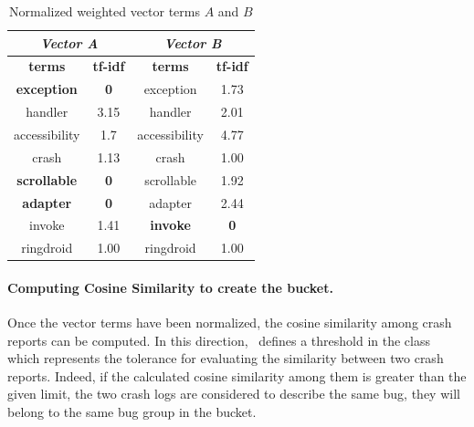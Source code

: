 \begin{table}[tb]
\centering
\caption{Normalized weighted vector terms $A$ and $B$}
\label{tbl: afternormal}
\begin{tabular}{|c|c|c|c|}
\hline
\multicolumn{2}{|c|}{{\color[HTML]{000000} \textit{\textbf{Vector A}}}} & \multicolumn{2}{c|}{{\color[HTML]{000000} \textit{\textbf{Vector B}}}} \\ \hline
\textbf{terms}                     & \textbf{tf-idf}                    & \textbf{terms}                    & \textbf{tf-idf}                    \\ \hline
\textbf{exception}                          & \textbf{0}                         & exception                         & 1.73                               \\ \hline
handler                            & 3.15                               & handler                           & 2.01                               \\ \hline
accessibility                      & 1.7                                & accessibility                     & 4.77                               \\ \hline
crash                              & 1.13                               & crash                             & 1.00                               \\ \hline
\textbf{scrollable}                         & \textbf{0}                         & scrollable                        & 1.92                               \\ \hline
\textbf{adapter}                            & \textbf{0}                         & adapter                           & 2.44                               \\ \hline
invoke                             & 1.41                               & \textbf{invoke}                            & \textbf{0}                         \\ \hline
ringdroid                          & 1.00                               & ringdroid                         & 1.00                               \\ \hline
\end{tabular}
\end{table}


\paragraph{Computing Cosine Similarity to create the bucket.}
Once the vector terms have been normalized, the cosine similarity among crash reports can be computed. In this direction, \toolname\ defines a threshold in the class \Oracle\,  which represents the tolerance for evaluating the similarity between two crash reports. Indeed, if the calculated cosine similarity among them is greater than the given limit, the two crash logs are considered to describe the same bug, \ie they will belong to the same bug group in the bucket. 

